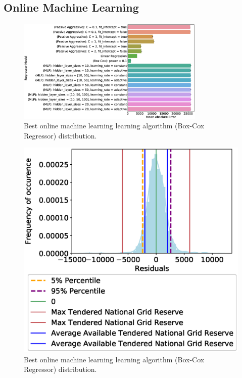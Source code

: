 \documentclass[final,3p,times,twocolumn,numbers]{elsarticle}
\begin{document}
\subsection{Online Machine Learning}


\begin{figure}
\includegraphics[width=0.8\textwidth]{figures/results/online_model_mae_barplot.eps}
\caption{Best online machine learning learning algorithm (Box-Cox Regressor) distribution.}
\label{fig:best_online_learning_day_distribution}
\end{figure}



\begin{figure}
\centering
\includegraphics[width=\columnwidth]{figures/results/online_learning_dists-power-0.1.eps}
\caption{Best online machine learning learning algorithm (Box-Cox Regressor) distribution.}
\label{fig:best_online_learning_day_distribution}
\end{figure}
\end{document}
